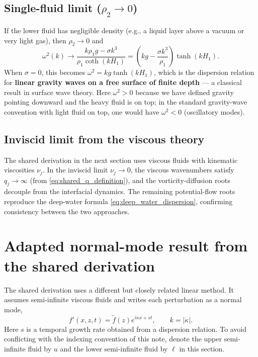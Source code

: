 \documentclass[11pt,a4paper]{article}
\begin{document}
\subsection{Single-fluid limit ($\rho_2\to 0$)}

If the lower fluid has negligible density (e.g., a liquid layer above a vacuum or very light gas), then $\rho_2\to 0$ and
\begin{equation}
    \omega^2(k) \to
    \frac{k\rho_1 g - \sigma k^3}{\rho_1\coth(kH_1)}
    =
    \left(kg - \frac{\sigma k^3}{\rho_1}\right)\tanh(kH_1).
    \label{eq:single_fluid_dispersion}
\end{equation}
When $\sigma=0$, this becomes $\omega^2 = kg\tanh(kH_1)$, which is the dispersion relation for \textbf{linear gravity waves on a free surface of finite depth} --- a classical result in surface wave theory.  Here $\omega^2>0$ because we have defined gravity pointing downward and the heavy fluid is on top; in the standard gravity-wave convention with light fluid on top, one would have $\omega^2<0$ (oscillatory modes).

\subsection{Inviscid limit from the viscous theory}

The shared derivation in the next section uses viscous fluids with kinematic viscosities $\nu_j$.  In the inviscid limit $\nu_j\to 0$, the viscous wavenumbers satisfy $q_j\to\infty$ (from \eqref{eq:shared_q_definition}), and the vorticity-diffusion roots decouple from the interfacial dynamics.  The remaining potential-flow roots reproduce the deep-water formula \eqref{eq:deep_water_dispersion}, confirming consistency between the two approaches.

\section{Adapted normal-mode result from the shared derivation}

The shared derivation uses a different but closely related linear method.  It assumes semi-infinite viscous fluids and writes each perturbation as a normal mode,
\begin{equation}
    f'(x,z,t)=\widetilde{f}(z)e^{i\kappa x+st},
    \qquad
    k=|\kappa|.
    \label{eq:shared_normal_mode_ansatz}
\end{equation}
Here $s$ is a temporal growth rate obtained from a dispersion relation.  To avoid conflicting with the indexing convention of this note, denote the upper semi-infinite fluid by $u$ and the lower semi-infinite fluid by $\ell$ in this section.
\end{document}
